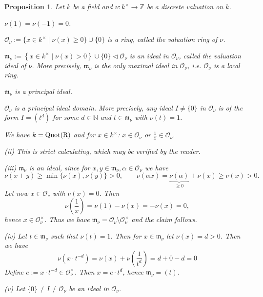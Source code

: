 \documentclass[11pt]{book}
\newtheorem{proposition}[theorem]{Proposition}
\theoremstyle{nonumberbreak}
\newenvironment{pr}[1][]{\ifthenelse{\equal{#1}{}}{\proof}{\proof[#1]}\rm}{\endproof}
\begin{document}
\begin{spacing}{1.3}
\begin{proposition} %
Let $k$ be a field and $\nu:k^{\times} \longrightarrow \mathbb{Z}$ be a discrete valuation on $k$.
\begin{compactenum}
\item $\nu(1)=\nu(-1)=0$.
\item $\mathcal{O}_{\nu}:= \{ x \in k^{\times} \mid \nu(x) \geqslant 0\} \cup \{0\}$ is a ring, called the \textit{valuation ring} of $\nu$. 
\item $\mathfrak{m}_{\nu}:= \left\{x \in k^{\times} \mid \nu(x) > 0 \right\} \cup \{0\} \triangleleft \mathcal{O}_{\nu}$ is an ideal in $\mathcal{O}_{\nu}$, called the \textit{valuation ideal} of $\nu$. More precisely, $\mathfrak{m}_{\nu}$ is the only maximal ideal in $\mathcal{O}_{\nu}$, i.e. $\mathcal{O}_{\nu}$ is a local ring.
\item $\mathfrak{m}_{\nu}$ is a principal ideal.
\item $\mathcal{O}_{\nu}$ is a principal ideal domain. More precisely, any ideal $I \neq \{0\}$ in $\mathcal{O}_{\nu}$ is of the form $I=( t^d )$ for some $d \in \mathbb{N}$ and $t \in \mathfrak{m}_{\nu}$ with $\nu(t)=1$.
\item We have $k=\rm{Quot}(R)$ and for $x \in k^{\times}$: $x \in \mathcal{O}_{\nu}$ or $\frac{1}{x} \in \mathcal{O}_{\nu}$.
\end{compactenum}
\begin{pr}
\begin{compactenum}
\item[(ii)] This is strict calculating, which may be verified by the reader.
\item[(iii)] $\mathfrak{m}_{\nu}$ is an ideal, since for $x,y \in \mathfrak{m}_{\nu}, \alpha \in \mathcal{O}_{\nu}$ we have
$$\nu(x+y) \geqslant \min\{\nu(x), \nu(y) \}>0, \qquad \nu(\alpha x)= \underbrace{\nu(\alpha)}_{\geqslant 0}+\nu(x) \geqslant \nu(x) >0.$$
Let now $x \in \mathcal{O}_{\nu}$ with $\nu(x)=0$. Then $$\nu\left(\frac{1}{x}\right)= \nu(1)-\nu(x)=-\nu(x)=0,$$hence $x \in \mathcal{O}_{\nu}^{\times}$.
Thus we have $\mathfrak{m}_{\nu}=\mathcal{O}_{\nu} \setminus \mathcal{O}_{\nu}^{\times}$ and the claim follows.
\item[(iv)] Let $t \in \mathfrak{m}_{\nu}$ such that $\nu(t)=1$. Then for $x \in \mathfrak{m}_{\nu}$ let $\nu(x)=d>0$. 
Then we have $$\nu\left(x \cdot t^{-d}\right)=\nu(x)+\nu\left(\frac{1}{t^d}\right)=d+0-d=0$$
Define $e:= x \cdot t^{-d} \in \mathcal{O}_{\nu}^{\times}$. Then $x=e \cdot t^d$, hence $\mathfrak{m}_{\nu}=( t )$.
\item[(v)] Let $\{0\}\neq I \neq \mathcal{O}_{\nu}$ be an ideal in $\mathcal{O}_{\nu}$.

\end{compactenum}
\end{pr}
\end{proposition}
\end{spacing}
\end{document}
